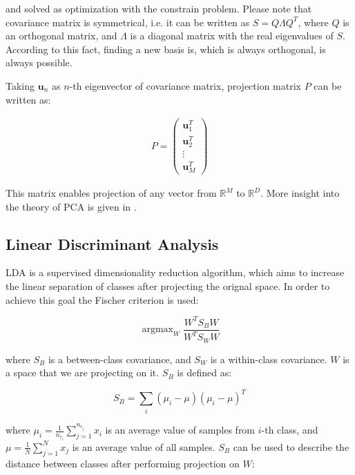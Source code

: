 \documentclass[a4paper, 10 pt, journal]{ieeeconf}
\newcommand{\bb}{\textbf}
\DeclareMathOperator*{\argmax}{argmax}
\begin{document}
and solved as optimization with the constrain problem. Please note that covariance matrix is symmetrical, i.e. it can be written as $S = Q \Lambda Q^{T}$, where $Q$ is an orthogonal matrix, and $\Lambda$ is a diagonal matrix with the real eigenvalues of $S$. According to this fact, finding a new basis is, which is always orthogonal, is always possible.

Taking $\bb{u}_{n}$ as $n$-th eigenvector of covariance matrix, projection matrix $P$ can be written as:

\begin{align}
	P =
	\left( \begin{array}{l}
		\bb{u}_1^T \\
		\bb{u}_2^T \\
		\vdots	 \\
		\bb{u}_M^T
	\end{array} \right)
\end{align}

This matrix enables projection of any vector from $\mathbb{R}^M$ to $\mathbb{R}^D$.
More insight into the theory of PCA is given in \cite{Pattern_recognition}.

\subsection{Linear Discriminant Analysis}

LDA is a supervised dimensionality reduction algorithm, which aims to increase the linear separation of classes after projecting the orignal space. In order to achieve this goal the Fischer criterion is used:

\begin{equation}
    \argmax_{W} \frac{W^{T} S_{B} W}{W^{T} S_{W} W}
    \label{eq:Fischer_criterion}
\end{equation}

where $S_{B}$ is a between-class covariance, and $S_{W}$ is a within-class covariance. $W$ is a space that we are projecting on it. $S_{B}$ is defined as:

\begin{equation}
    S_B = \sum_{i} (\mu_{i} - \mu)(\mu_{i} - \mu)^{T}
\end{equation}

where $\mu_i = \frac{1}{n_{c_i}} \sum_{j=1}^{n_{c_j}} x_i$ is an average value of samples from $i$-th class, and $\mu = \frac{1}{N} \sum_{j=1}^{N} x_j$ is an average value of all samples. $S_B$ can be used to describe the distance between classes after performing projection on $W$:
\end{document}

